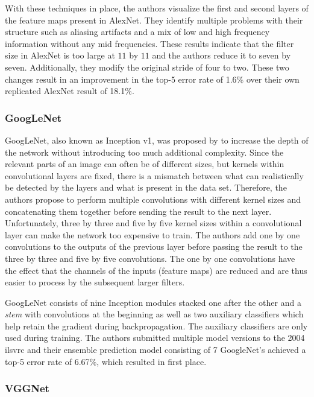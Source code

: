 \documentclass[draft,final]{vutinfth} %
\begin{document}
With these techniques in place, the authors visualize the first and
second layers of the feature maps present in AlexNet. They identify
multiple problems with their structure such as aliasing artifacts and
a mix of low and high frequency information without any mid
frequencies. These results indicate that the filter size in AlexNet is
too large at $11$ by $11$ and the authors reduce it to seven by
seven. Additionally, they modify the original stride of four to
two. These two changes result in an improvement in the top-5 error
rate of 1.6\% over their own replicated AlexNet result of 18.1\%.

\subsubsection{GoogLeNet}
\label{sssec:theory-googlenet}

GoogLeNet, also known as Inception v1, was proposed by
\textcite{szegedy2015} to increase the depth of the network without
introducing too much additional complexity. Since the relevant parts
of an image can often be of different sizes, but kernels within
convolutional layers are fixed, there is a mismatch between what can
realistically be detected by the layers and what is present in the
data set. Therefore, the authors propose to perform multiple
convolutions with different kernel sizes and concatenating them
together before sending the result to the next layer. Unfortunately,
three by three and five by five kernel sizes within a convolutional
layer can make the network too expensive to train. The authors add one
by one convolutions to the outputs of the previous layer before
passing the result to the three by three and five by five
convolutions. The one by one convolutions have the effect that the
channels of the inputs (feature maps) are reduced and are thus easier
to process by the subsequent larger filters.

GoogLeNet consists of nine Inception modules stacked one after the
other and a \emph{stem} with convolutions at the beginning as well as
two auxiliary classifiers which help retain the gradient during
backpropagation. The auxiliary classifiers are only used during
training. The authors submitted multiple model versions to the 2004
\gls{ilsvrc} and their ensemble prediction model consisting of 7
GoogleNet's achieved a top-5 error rate of 6.67\%, which resulted in
first place.

\subsubsection{VGGNet}
\label{sssec:theory-vggnet}
\end{document}

